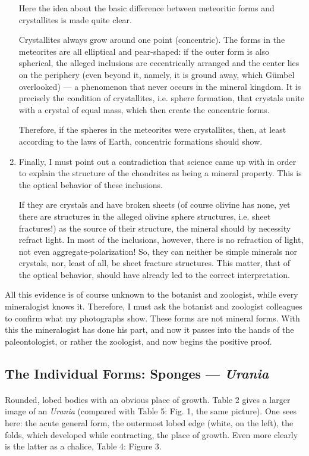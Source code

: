 \documentclass[a4paper, 12pt, oneside]{article}
\begin{document}
\begin{enumerate}
    Here the idea about the basic difference between meteoritic forms and crystallites is made quite clear.
    
    Crystallites always grow around one point (concentric). The forms in the meteorites are all elliptical and pear-shaped: if the outer form is also spherical, the alleged inclusions are eccentrically arranged and the center lies on the periphery (even beyond it, namely, it is ground away, which Gümbel overlooked) --- a phenomenon that never occurs in the mineral kingdom. It is precisely the condition of crystallites, i.e. sphere formation, that crystals unite with a crystal of equal mass, which then create the concentric forms.
    
    Therefore, if the spheres in the meteorites were crystallites, then, at least according to the laws of Earth, concentric formations should show.
    \item Finally, I must point out a contradiction that science came up with in order to explain the structure of the chondrites as being a mineral property. This is the optical behavior of these inclusions.
    
    If they are crystals and have broken sheets (of course olivine has none, yet there are structures in the alleged olivine sphere structures, i.e. sheet fractures!) as the source of their structure, the mineral should by necessity refract light. In most of the inclusions, however, there is no refraction of light, not even aggregate-polarization! So, they can neither be simple minerals nor crystals, nor, least of all, be sheet fracture structures. This matter, that of the optical behavior, should have already led to the correct interpretation.
\end{enumerate}
All this evidence is of course unknown to the botanist and zoologist, while every mineralogist knows it. Therefore, I must ask the botanist and zoologist colleagues to confirm what my photographs show. These forms are not mineral forms. With this the mineralogist has done his part, and now it passes into the hands of the paleontologist, or rather the zoologist, and now begins the positive proof.
\clearpage
\subsection{The Individual Forms: Sponges --- \emph{Urania}}
\paragraph{}
Rounded, lobed bodies with an obvious place of growth. Table 2 gives a larger image of an \emph{Urania} (compared with Table 5: Fig. 1, the same picture). One sees here: the acute general form, the outermost lobed edge (white, on the left), the folds, which developed while contracting, the place of growth. Even more clearly is the latter as a chalice, Table 4: Figure 3.
\end{document}

